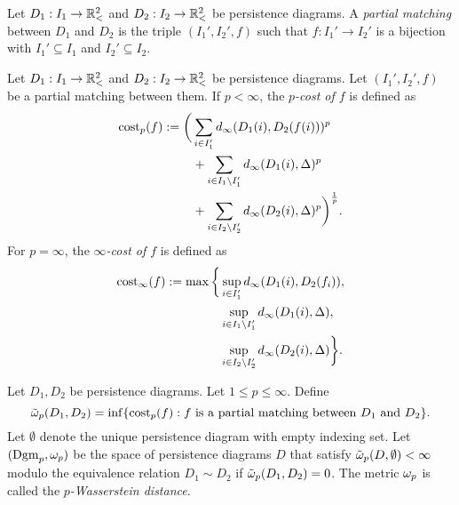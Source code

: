 \begin{definition}
    Let $ D_1: I_1 \to \mathbb{R}_<^2 $ and $ D_2: I_2 \to \mathbb{R}_<^2 $ be persistence diagrams. A {\it partial matching} between $ D_1 $ and $ D_2 $ is the triple $ (I_1', I_2', f) $ such that $ f: I_1' \to I_2' $ is a bijection with $ I_1' \subseteq I_1 $ and $ I_2' \subseteq I_2 $.
\end{definition}

\begin{definition}[$p$-cost] \label{def:pcost}
    Let $ D_1: I_1 \to \mathbb{R}_<^2 $ and $ D_2: I_2 \to \mathbb{R}_<^2 $ be persistence diagrams. Let $ (I_1', I_2', f) $ be a partial matching between them. If $ p < \infty $, the {\it $p$-cost of $ f $} is defined as
    \begin{align*}
        \operatorname{cost}_p(f) := \bigg(&\sum_{i \in I_1'} d_\infty(D_1(i), D_2(f(i)))^p \\
        &+ \sum_{i \in I_1 \setminus I_1'} d_\infty(D_1(i), \Delta)^p \\
        &+ \sum_{i \in I_2 \setminus I_2'} d_\infty(D_2(i), \Delta)^p \bigg)^{\frac{1}{p}}.
    \end{align*}
    For $ p = \infty $, the {\it $\infty$-cost of $ f $} is defined as
    \begin{align*}
        \operatorname{cost}_\infty(f) := \max \bigg\{&\sup_{i \in I_1'} d_\infty(D_1(i), D_2(f_i)), \\
        &\sup_{i\in I_1 \setminus I_1'} d_\infty(D_1(i), \Delta), \\
        &\sup_{i\in I_2 \setminus I_2'} d_\infty(D_2(i), \Delta)\bigg\}.
    \end{align*}
\end{definition}

\begin{definition} \label{def:Wasserstein}
    Let $ D_1, D_2 $ be persistence diagrams. Let $ 1 \leq p \leq \infty $. Define
    \begin{equation}
        \tilde \omega_p (D_1, D_2) = \inf \{\operatorname{cost}_p(f) : f \text{ is a partial matching between } D_1 \text{ and } D_2 \}.
    \end{equation}
    Let $ \emptyset $ denote the unique persistence diagram with empty indexing set. Let $ (\operatorname{Dgm}_p, \omega_p) $ be the space of persistence diagrams $ D $ that satisfy $ \tilde \omega_p(D, \emptyset) < \infty $ modulo the equivalence relation $ D_1 \sim D_2 $ if $ \tilde \omega_p (D_1, D_2) = 0 $. The metric $ \omega_p $ is called the {\it $p$-Wasserstein distance}.
\end{definition}


